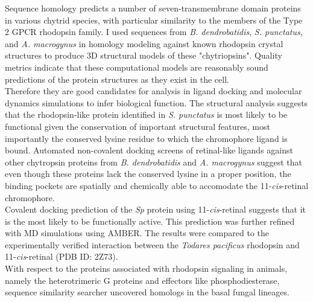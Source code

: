 \indent Sequence homology predicts a number of seven-transmembrane domain proteins in various chytrid species, with particular similarity to the members of the Type 2 GPCR rhodopsin family. I used sequences from \textit{B. dendrobatidis}, \textit{S. punctatus}, and \textit{A. macrogynus} in homology modeling against known rhodopsin crystal structures to produce 3D structural models of these "chytriopsins". Quality metrics indicate that these computational models are reasonably sound predictions of the protein structures as they exist in the cell.\\
\indent Therefore they are good candidates for analysis in ligand docking and molecular dynamics simulations to infer biological function. The structural analysis suggests that the rhodopsin-like protein identified in \textit{S. punctatus} is most likely to be functional given the conservation of important structural features, most importantly the conserved lysine residue to which the chromophore ligand is bound. Automated non-covalent docking screens of retinal-like ligands against other chytropsin proteins from \textit{B. dendrobatidis} and \textit{A. macrogynus} suggest that even though these proteins lack the conserved lysine in a proper position, the binding pockets are spatially and chemically able to accomodate the 11-\textit{cis}-retinal chromophore.\\
\indent Covalent docking prediction of the \textit{Sp} protein using 11-\textit{cis}-retinal suggests that it is the most likely to be functionally active. This prediction was further refined with MD simulations using AMBER. The results were compared to the experimentally verified interaction between the \textit{Todares pacificus} rhodopsin and 11-\textit{cis}-retinal (PDB ID: 2Z73). \\
\indent With respect to the proteins associated with rhodopsin signaling in animals, namely the heterotrimeric G proteins and effectors like phosphodiesterase, sequence similarity searcher uncovered homologs in the basal fungal lineages. \\
